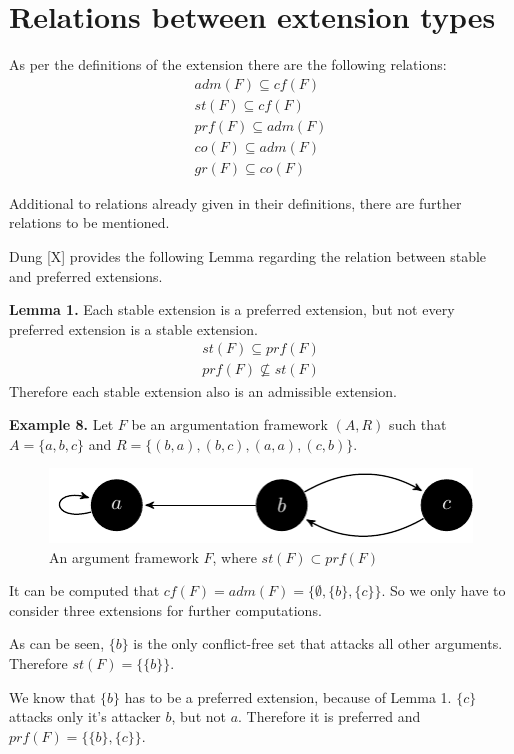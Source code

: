 \documentclass[draft,final]{vutinfth} %
\newcommand{\hl}{\par\vspace{6pt}} %
\newcommand{\cl}{\par\vspace{12pt}} %
\begin{document}
\section{Relations between extension types}

As per the definitions of the extension there are the following relations:
\begin{align} %
	adm(F)\subseteq cf(F)\\
	st(F)\subseteq cf(F)\\
	prf(F)\subseteq adm(F)\\
	co(F)\subseteq adm(F)\\
	gr(F)\subseteq co(F)
\end{align}\cl

Additional to relations already given in their definitions, there are further relations to be mentioned.\hl
Dung [X] provides the following Lemma regarding the relation between stable and preferred extensions.\hl %

\textbf{Lemma 1.}
Each stable extension is a preferred extension, but not every preferred extension is a stable extension.
\begin{align}
	st(F)\subseteq prf(F)\\
	prf(F)\not\subseteq st(F)
\end{align}
Therefore each stable extension also is an admissible extension.\hl

\textbf{Example 8.} Let $F$ be an argumentation framework $(A,R)$ such that $A=\{a,b,c\}$ and $R=\{(b,a),(b,c),(a,a),(c,b)\}$.\hl

\FloatBarrier
	\begin{figure}[!h]
		\centering
		\includegraphics[width=\linewidth]{graphs/ex2_v2.pdf}
		\caption{An argument framework $F$, where $st(F)\subset prf(F)$}
	\end{figure}
\FloatBarrier

It can be computed that $cf(F)=adm(F)=\{\emptyset,\{b\},\{c\}\}$. So we only have to consider three extensions for further computations.\hl
As can be seen, $\{b\}$ is the only conflict-free set that attacks all other arguments. Therefore $st(F)=\{\{b\}\}$.\hl
We know that $\{b\}$ has to be a preferred extension, because of Lemma 1. $\{c\}$ attacks only it's attacker $b$, but not $a$. Therefore it is preferred and $prf(F)=\{\{b\},\{c\}\}$.\cl
\end{document}
